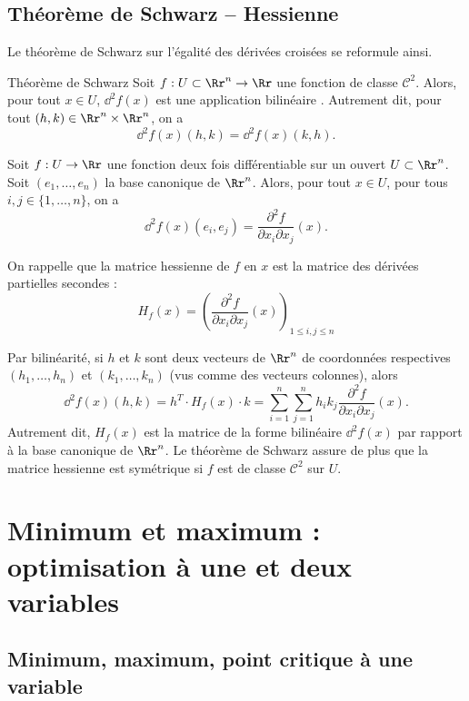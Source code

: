 \subsection{Théorème de Schwarz -- Hessienne}

Le théorème de Schwarz sur l'égalité des dérivées croisées se reformule ainsi.
\begin{theoreme}{Théorème de Schwarz}{}
Soit $f:U\subset \Rr^n\to \Rr$ une fonction de classe $\mathcal{C}^2$. 
Alors, pour tout $x \in U$, $\dd^2f(x)$ est une application bilinéaire . 
Autrement dit, pour tout $(h,k)\in \Rr^n \times \Rr^n$, on a
$$\dd^2f(x)(h,k) = \dd^2f(x)(k,h).$$
\end{theoreme}


\bigskip

Soit $f: U \to \Rr$ une fonction deux fois différentiable sur un ouvert $U \subset \Rr^n$.
Soit $(e_1,\ldots,e_n)$ la base canonique de $\Rr^n$.
Alors, pour tout $x \in U$, pour tous $i,j \in \{1,\ldots,n\}$, on a
$$\dd^2 f(x) (e_i,e_j) =\frac{\partial^2 f}{\partial x_i\partial x_j}(x).$$

On rappelle que la matrice hessienne de $f$ en $x$ est la matrice des dérivées partielles secondes :
$$H_f(x) = \left( \frac{\partial ^2f}{\partial x_i\partial x_j}(x) \right)_{1 \le i,j \le n}$$

Par bilinéarité, si $h$ et $k$ sont deux vecteurs de $\Rr^n$ de coordonnées respectives $(h_1,\ldots,h_n)$ et $(k_1,\ldots,k_n)$ (vus comme des vecteurs colonnes), alors
$$\dd^2 f (x) (h,k)= h^T \cdot  H_f(x) \cdot k 
= \sum_{i=1}^n \sum_{j=1}^n h_ik_j   \frac{\partial^2 f}{\partial x_i \partial x_j}(x).$$
Autrement dit, $H_f(x)$ est la matrice de la forme bilinéaire $\dd^2f(x)$ par rapport
à la base canonique de $\Rr^n$. Le théorème de Schwarz assure de plus que la matrice hessienne est symétrique si $f$ est de classe $\mathcal{C}^2$ sur $U$.









\section{Minimum et maximum : optimisation à une et deux variables}
\subsection{Minimum, maximum, point critique à une variable}

